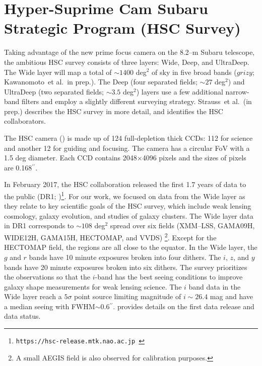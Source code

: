 \documentclass[useamsfonts]{pasj01}
\def\asec{$^{\prime\prime}$}
\def\etal{{\ et al.~}}
\begin{document}
\section{Hyper-Suprime Cam Subaru Strategic Program (HSC Survey)}
    \label{sec:ssp}

    Taking advantage of the new prime focus camera on the 8.2--m Subaru telescope,
    the ambitious HSC survey consists of three layers: Wide, Deep, and UltraDeep.
    The Wide layer will map a total of ${\sim}1400$ deg$^2$ of sky in five broad bands
    ($grizy$; Kawanomoto\etal in prep.).
    The Deep (four separated fields; ${\sim}27$ deg$^2$) and UltraDeep (two separated
    fields; ${\sim}3.5$ deg$^2$) layers use a few additional narrow-band filters
    and employ a slightly different surveying strategy.
    Strauss\etal (in prep.) describes the HSC survey in more detail, and identifies the
    HSC collaborators.

    The HSC camera (\citealt{Miyazaki2012}) is made up of 124 full-depletion thick
    CCDs: 112 for science and another 12 for guiding and focusing.
    The camera has a circular FoV with a 1.5 deg diameter.
    Each CCD contains 2048$\times$4096 pixels and the sizes of pixels are 0.168\asec{}.

    In February 2017, the HSC collaboration released the first 1.7 years of data to
    the public (DR1;
    \citealt{HSCDR1})\footnote{\texttt{https://hsc-release.mtk.nao.ac.jp }}.
    For our work, we focused on data from the Wide layer as they relate to key
    scientific goals of the HSC survey, which include weak lensing cosmology, galaxy evolution, and studies of galaxy clusters.  The Wide layer data in DR1 corresponds to ${\sim}108$ deg$^2$ spread over 
   six fields (XMM--LSS, GAMA09H, WIDE12H, GAMA15H, HECTOMAP, and VVDS)
    \footnote{A small AEGIS field is also observed for calibration purposes.}.
    Except for the HECTOMAP field, the regions are all close to the equator.
    In the Wide layer, the $g$ and $r$ bands have 10 minute exposures broken into four
    dithers.  The  $i$, $z$, and $y$ bands have 20 minute exposures broken into six dithers. The survey prioritizes the observations so that the $i$-band has the best seeing conditions to improve galaxy shape measurements for weak lensing science. The  $i$ band data in the Wide layer reach a $5\sigma$ point source limiting magnitude of  $i{\sim} 26.4$ mag  and have a median seeing with FWHM${\sim}0.6$\asec{}. \citealt{HSCDR1} provides details on the first data release and data status.
\end{document}
